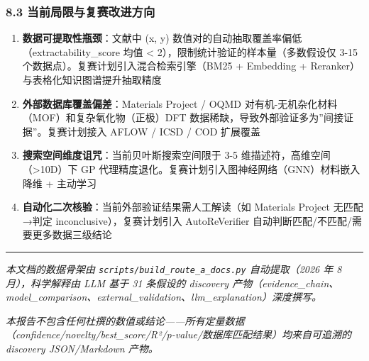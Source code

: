 \documentclass[12pt,a4paper]{ctexart}
\providecommand{\tightlist}{%
  \setlength{\itemsep}{0pt}\setlength{\parskip}{0pt}}
\begin{document}
\subsubsection{8.3 当前局限与复赛改进方向}\label{ux5f53ux524dux5c40ux9650ux4e0eux590dux8d5bux6539ux8fdbux65b9ux5411}

\begin{enumerate}
\def\labelenumi{\arabic{enumi}.}
\tightlist
\item
  \textbf{数据可提取性瓶颈}：文献中 (x, y) 数值对的自动抽取覆盖率偏低（extractability\_score 均值 \textless{} 2），限制统计验证的样本量（多数假设仅 3-15 个数据点）。复赛计划引入混合检索引擎（BM25 + Embedding + Reranker）与表格化知识图谱提升抽取精度
\item
  \textbf{外部数据库覆盖偏差}：Materials Project / OQMD 对有机-无机杂化材料（MOF）和复杂氧化物（正极）DFT 数据稀缺，导致外部验证多为''间接证据''。复赛计划接入 AFLOW / ICSD / COD 扩展覆盖
\item
  \textbf{搜索空间维度诅咒}：当前贝叶斯搜索空间限于 3-5 维描述符，高维空间（\textgreater10D）下 GP 代理精度退化。复赛计划引入图神经网络（GNN）材料嵌入降维 + 主动学习
\item
  \textbf{自动化二次核验}：当前外部验证结果需人工解读（如 Materials Project 无匹配→判定 inconclusive），复赛计划引入 AutoReVerifier 自动判断匹配/不匹配/需要更多数据三级结论
\end{enumerate}

\begin{center}\rule{0.5\linewidth}{0.5pt}\end{center}

\emph{本文档的数据骨架由 \texttt{scripts/build\_route\_a\_docs.py} 自动提取（2026 年 8 月），科学解释由 LLM 基于 31 条假设的 discovery 产物（evidence\_chain、model\_comparison、external\_validation、llm\_explanation）深度撰写。}

\emph{本报告不包含任何杜撰的数值或结论------所有定量数据（confidence/novelty/best\_score/R²/p-value/数据库匹配结果）均来自可追溯的 discovery JSON/Markdown 产物。}
\end{document}
